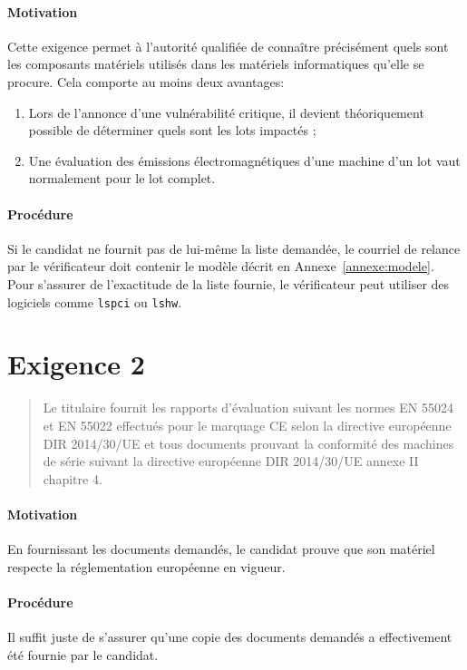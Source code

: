 \documentclass{report}
\begin{document}
\paragraph{Motivation}
%
Cette exigence permet à l’autorité qualifiée de connaître précisément quels sont
les composants matériels utilisés dans les matériels informatiques qu’elle se
procure.
%
Cela comporte au moins deux avantages:

\begin{enumerate}
\item Lors de l’annonce d’une vulnérabilité critique, il devient théoriquement
  possible de déterminer quels sont les lots impactés ;
\item Une évaluation des émissions électromagnétiques d’une machine d’un lot
  vaut normalement pour le lot complet.
\end{enumerate}

\paragraph{Procédure}
Si le candidat ne fournit pas de lui-même la liste demandée, le courriel de
relance par le vérificateur doit contenir le modèle décrit en
Annexe~\ref{annexe:modele}.
%
Pour s’assurer de l’exactitude de la liste fournie, le vérificateur peut
utiliser des logiciels comme \texttt{lspci} ou \texttt{lshw}.
%

\section{Exigence 2}

\begin{quote}
  Le titulaire fournit les rapports d’évaluation suivant les normes EN 55024 et
  EN 55022 effectués pour le marquage CE selon la directive européenne DIR
  2014/30/UE et tous documents prouvant la conformité des machines de série
  suivant la directive européenne DIR 2014/30/UE annexe II chapitre 4.
\end{quote}

\paragraph{Motivation}
%
En fournissant les documents demandés, le candidat prouve que son matériel
respecte la réglementation européenne en vigueur.

\paragraph{Procédure}
%
Il suffit juste de s’assurer qu’une copie des documents demandés a effectivement
été fournie par le candidat.
\end{document}
